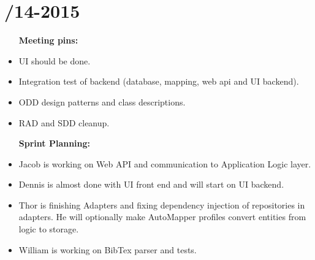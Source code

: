 \section{/14-2015} %
\attend{\at}{\at}{\at}{\at}


\begin{itemize}
	\item [\textbf{Meeting pins:}]
	\item UI should be done.
	\item Integration test of backend (database, mapping, web api and UI backend).
	\item ODD design patterns and class descriptions. 
	\item RAD and SDD cleanup. 
\end{itemize}

\begin{itemize}
	\item [\textbf{Sprint Planning:}]
	\item Jacob is working on Web API and communication to Application Logic layer.
	\item Dennis is almost done with UI front end and will start on UI backend. 
	\item Thor is finishing Adapters and fixing dependency injection of repositories in adapters. He will optionally make AutoMapper profiles convert entities from logic to storage. 
	\item William is working on BibTex parser and tests. 
\end{itemize}

